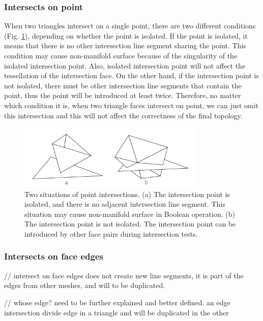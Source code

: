 \documentclass[10pt,journal,compsoc]{IEEEtran}
\begin{document}
\subsubsection{Intersects on point}
\label{sec:ipoint}
When two triangles intersect on a single point, there are two different conditions (Fig. \ref{fig:isolated}), depending on whether the point is isolated. If the point is isolated, it means that there is no other intersection line segment sharing the point. This condition may cause non-manifold surface because of the singularity of the isolated intersection point. Also, isolated intersection point will not affect the tessellation of the intersection face. On the other hand, if the intersection point is not isolated, there must be other intersection line segments that contain the point, thus the point will be introduced at least twice. Therefore, no matter which condition it is, when two triangle faces intersect on point, we can just omit this intersection and this will not affect the correctness of the final topology.

\begin{figure}[t]
\centering
\includegraphics[width=3.5in]{isolated}
\caption{Two situations of point intersections. (a) The intersection point is isolated, and there is no adjacent intersection line segment. This situation may cause non-manifold surface in Boolean operation. (b) The intersection point is not isolated. The intersection point can be introduced by other face pairs during intersection tests.}
\label{fig:isolated}
\end{figure}


\subsubsection{Intersects on face edges}

// intersect on face edges does not create new line segments, it is part of the edges from other meshes, and will to be duplicated.


// whose edge? need to be further explained and better defined. an edge intersection divide edge in a triangle and will be duplicated in the other
\end{document}
